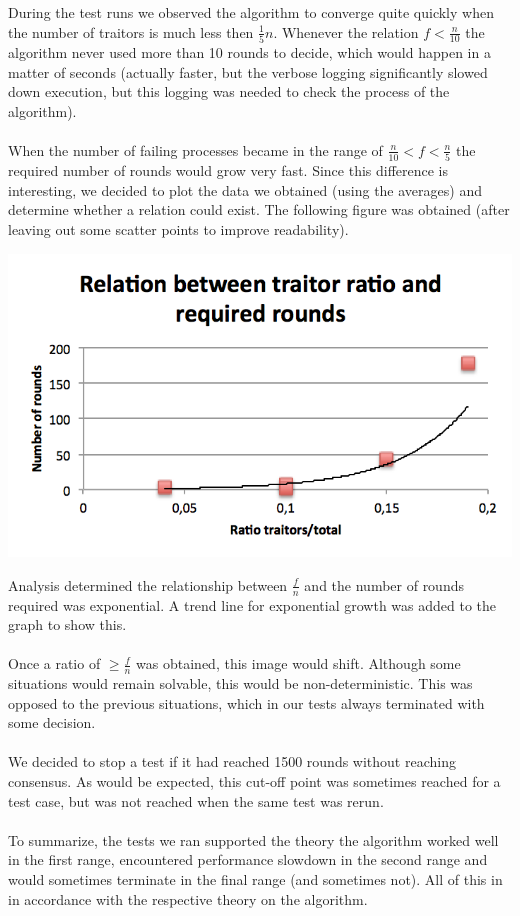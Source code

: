 \documentclass[a4paper]{IEEEtran}
\begin{document}
During the test runs we observed the algorithm to converge quite quickly when the number of traitors is much less then $\frac{1}{5}n$.
Whenever the relation $f < \frac{n}{10}$ the algorithm never used more than 10 rounds to decide,
which would happen in a matter of seconds (actually faster, but the verbose logging significantly slowed down execution, but this logging was needed to check the process of the algorithm).
\\
\\
When the number of failing processes became in the range of $\frac{n}{10} < f < \frac{n}{5}$ the required number of rounds would grow very fast.
Since this difference is interesting, we decided to plot the data we obtained (using the averages) and determine whether a relation could exist.
The following figure was obtained (after leaving out some scatter points to improve readability).

\includegraphics[scale=0.7]{relationship.png}

Analysis determined the relationship between $\frac{f}{n}$ and the number of rounds required was exponential.
A trend line for exponential growth was added to the graph to show this.
\\
\\
Once a ratio of $\geq \frac{f}{n}$ was obtained, this image would shift.
Although some situations would remain solvable, this would be non-deterministic.
This was opposed to the previous situations, which in our tests always terminated with some decision.
\\
\\
We decided to stop a test if it had reached 1500 rounds without reaching consensus.
As would be expected, this cut-off point was sometimes reached for a test case,
but was not reached when the same test was rerun. 
\\
\\
To summarize, the tests we ran supported the theory the algorithm worked well in the first range, encountered performance slowdown in the second range and would sometimes terminate in the final range (and sometimes not).
All of this in in accordance with the respective theory on the algorithm.
\end{document}

